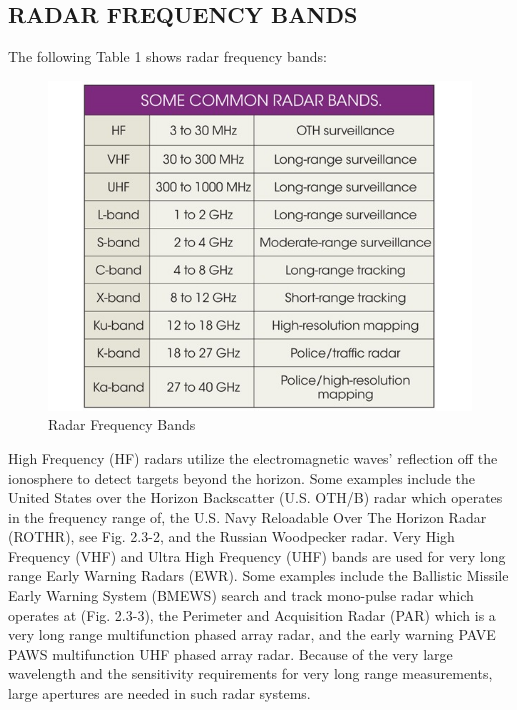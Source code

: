 \documentclass[14pt]{article} %
\begin{document}
\subsection{RADAR FREQUENCY BANDS}
The following Table 1 shows radar frequency bands:

\begin{figure}[H]
  \includegraphics[width=\linewidth]{band.jpg}
  \caption{Radar Frequency Bands}
  \label{fig:figure 3}
\end{figure}
 

High Frequency (HF) radars utilize the electromagnetic waves’ reflection off the ionosphere to detect targets beyond the horizon. Some examples include the United States over the Horizon Backscatter (U.S. OTH/B) radar which operates in the frequency range of, the U.S. Navy Reloadable Over The Horizon Radar (ROTHR), see Fig. 2.3-2, and the Russian Woodpecker radar. Very High Frequency (VHF) and Ultra High Frequency (UHF) bands are used for very long range Early Warning Radars (EWR). Some examples include the Ballistic Missile Early Warning System (BMEWS) search and track mono-pulse radar which operates at (Fig. 2.3-3), the Perimeter and Acquisition Radar (PAR) which is a very long range multifunction phased
array radar, and the early warning PAVE PAWS multifunction UHF phased array radar. Because of the very large wavelength and the sensitivity requirements for very long range measurements, large apertures are needed in such radar systems.
\end{document}

